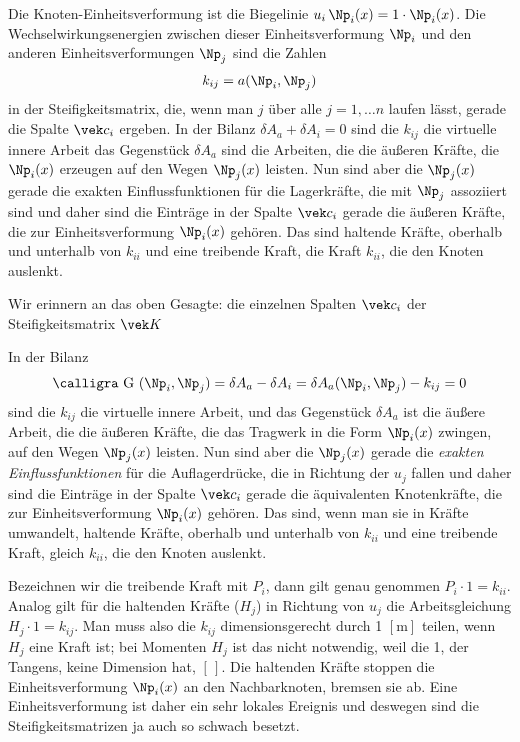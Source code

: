 {Die Knoten-Einheitsverformung ist die Biegelinie $u_i\,\Np_i(x) = 1 \cdot \Np_i(x)$. Die Wechselwirkungsenergien zwischen dieser Einheitsverformung $\Np_i$ und den anderen Einheitsverformungen $\Np_j$ sind die Zahlen
\begin{align}
k_{ij} = a(\Np_i,\Np_j)
\end{align}
in der Steifigkeitsmatrix, die, wenn man $j$ \"{u}ber alle $j = 1, \ldots n$ laufen l\"{a}sst, gerade die Spalte $\vek c_i$ ergeben. In der Bilanz $\delta A_a + \delta A_i = 0$ sind die $k_{ij}$ die virtuelle innere Arbeit das Gegenst\"{u}ck $\delta A_a$ sind die Arbeiten, die die \"{a}u{\ss}eren Kr\"{a}fte, die $\Np_i(x)$ erzeugen auf den Wegen $\Np_j(x)$ leisten. Nun sind aber die $\Np_j(x)$ gerade die exakten Einflussfunktionen f\"{u}r die Lagerkr\"{a}fte, die mit $\Np_j$ assoziiert sind und daher sind die Eintr\"{a}ge in der Spalte $\vek c_i$ gerade die \"{a}u{\ss}eren Kr\"{a}fte, die zur Einheitsverformung $\Np_i(x)$
geh\"{o}ren. Das sind haltende Kr\"{a}fte, oberhalb und unterhalb von $k_{ii}$ und eine treibende Kraft, die Kraft $k_{ii}$, die den Knoten auslenkt.

Wir erinnern an das oben Gesagte: die einzelnen Spalten $\vek c_i$ der Steifigkeitsmatrix $\vek K$


In der Bilanz
\begin{align}
\text{\normalfont\calligra G\,\,}(\Np_i,\Np_j) = \delta A_a - \delta A_i = \delta A_a(\Np_i,\Np_j) - k_{ij} = 0
\end{align}
sind die $k_{ij}$ die virtuelle innere Arbeit, und das Gegenst\"{u}ck $\delta A_a$ ist die \"{a}u{\ss}ere Arbeit, die die \"{a}u{\ss}eren Kr\"{a}fte, die das Tragwerk in die Form $\Np_i(x)$ zwingen, auf den Wegen $\Np_j(x)$ leisten. Nun sind aber die $\Np_j(x)$ gerade die {\em exakten Einflussfunktionen\/} f\"{u}r die Auflagerdr\"{u}cke, die in Richtung der $u_j$ fallen und daher sind die Eintr\"{a}ge in der Spalte $\vek c_i$ gerade die \"{a}quivalenten Knotenkr\"{a}fte, die zur Einheitsverformung $\Np_i(x)$ geh\"{o}ren. Das sind, wenn man sie in Kr\"{a}fte umwandelt, haltende Kr\"{a}fte, oberhalb und unterhalb von $k_{ii}$ und eine treibende Kraft, gleich $k_{ii}$, die den Knoten auslenkt.

Bezeichnen wir die treibende Kraft mit $P_i$, dann gilt genau genommen $P_i \cdot 1 = k_{ii}$. Analog gilt f\"{u}r die haltenden Kr\"{a}fte ($H_j$) in Richtung von $u_j$ die Arbeitsgleichung $H_j \cdot 1 = k_{ij}$. Man muss also die $k_{ij}$ dimensionsgerecht durch 1 $[\text{m}]$ teilen, wenn $H_j$ eine Kraft ist; bei Momenten $H_j$ ist das nicht notwendig, weil die 1, der Tangens, keine Dimension hat, $[\,]$. Die haltenden Kr\"{a}fte stoppen die Einheitsverformung $\Np_i(x)$ an den Nachbarknoten, bremsen sie ab. Eine Einheitsverformung ist daher ein sehr lokales Ereignis und deswegen sind die Steifigkeitsmatrizen ja auch so schwach besetzt.

}
